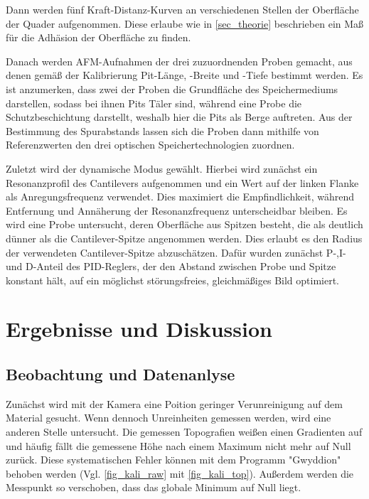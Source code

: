 \documentclass[
	a4paper,
	12pt,
	pagesize,
	ngerman
]{scrartcl}
\begin{document}
	Dann werden fünf Kraft-Distanz-Kurven an verschiedenen Stellen der Oberfläche der Quader aufgenommen.
	Diese erlaube wie in \cref{sec_theorie} beschrieben ein Maß für die Adhäsion der Oberfläche zu finden.

	Danach werden AFM-Aufnahmen der drei zuzuordnenden Proben gemacht, aus denen gemäß der Kalibrierung Pit-Länge, -Breite und -Tiefe bestimmt werden.
	Es ist anzumerken, dass zwei der Proben die Grundfläche des Speichermediums darstellen, sodass bei ihnen Pits Täler sind, während eine Probe die Schutzbeschichtung darstellt, weshalb hier die Pits als Berge auftreten.
	Aus der Bestimmung des Spurabstands lassen sich die Proben dann mithilfe von Referenzwerten den drei optischen Speichertechnologien zuordnen.

	Zuletzt wird der dynamische Modus gewählt.
	Hierbei wird zunächst ein Resonanzprofil des Cantilevers aufgenommen und ein Wert auf der linken Flanke als Anregungsfrequenz verwendet.
	Dies maximiert die Empfindlichkeit, während Entfernung und Annäherung der Resonanzfrequenz unterscheidbar bleiben.
	Es wird eine Probe untersucht, deren Oberfläche aus Spitzen besteht, die als deutlich dünner als die Cantilever-Spitze angenommen werden.
	Dies erlaubt es den Radius der verwendeten Cantilever-Spitze abzuschätzen.
	Dafür wurden zunächst P-,I- und D-Anteil des PID-Reglers, der den Abstand zwischen Probe und Spitze konstant hält, auf ein möglichst störungsfreies, gleichmäßiges Bild optimiert.


	\section{Ergebnisse und Diskussion}


	\subsection{Beobachtung und Datenanlyse}

	Zunächst wird mit der Kamera eine Poition geringer Verunreinigung auf dem Material gesucht.
	Wenn dennoch Unreinheiten gemessen werden, wird eine anderen Stelle untersucht.
	Die gemessen Topografien weißen einen Gradienten auf und häufig fällt die gemessene Höhe nach einem Maximum nicht mehr auf Null zurück. %
	Diese systematischen Fehler können mit dem Programm "Gwyddion" behoben werden (Vgl. \cref{fig_kali_raw} mit \cref{fig_kali_top}).
	Außerdem werden die Messpunkt so verschoben, dass das globale Minimum auf Null liegt.
\end{document}
